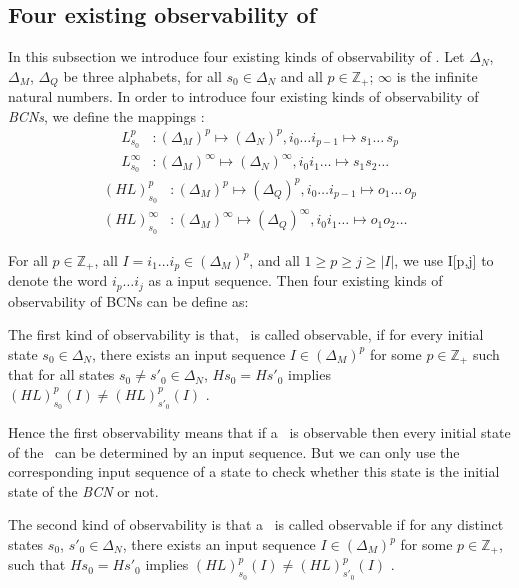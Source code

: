 \subsection{Four existing observability of \BCNs}
In this subsection we introduce four existing kinds of observability of \BCNs. Let $\Delta_N$, $\Delta_M$, $\Delta_Q$ be three alphabets, for all $s_0\in \Delta_N$ and all $p\in \mathbb{Z}_+$; $\infty$ is the infinite natural numbers. In order to introduce four existing kinds of observability of {\em BCNs}, we define the mappings \cite{Zhang2016Observability}:
\begin{equation}
\begin{split}
L^p_{s_0} &: (\Delta_M)^p\mapsto(\Delta_N)^p, i_0\ldots i_{p-1} \mapsto s_1 \ldots\, s_p\\
L^{\infty}_{s_0} &: (\Delta_M)^{\infty}\mapsto(\Delta_N)^{\infty}, i_0 i_1 \ldots  \mapsto s_1 s_2 \ldots
\end{split}
\end{equation}
\begin{equation}
\begin{split}
(HL)^p_{s_0} &: (\Delta_M)^p\mapsto(\Delta_Q)^p, i_0\ldots i_{p-1} \mapsto o_1\ldots\, o_p\\
(HL)^{\infty}_{s_0} &: (\Delta_M)^{\infty}\mapsto(\Delta_Q)^{\infty}, i_0 i_1 \ldots  \mapsto o_1 o_2\ldots
\end{split}
\end{equation}

For all  $p\in \mathbb{Z}_+$, all $I=i_1 \ldots i_p \in(\Delta_M)^p$, and all $1\ge p \ge j \ge |I|$, we use I[p,j] to denote the word $i_p \ldots i_j$ as a input sequence. Then four existing kinds of observability of BCNs can be define as: 
\begin{definition}
The first kind of observability is that, \BCN\ is called observable, if for every initial state $s_0 \in \Delta_N$, there exists an input sequence $I\in(\Delta_M)^p$ for some $p\in \mathbb{Z}_+$ such that for all states $s_0\neq {s'}_0\in \Delta_N$, $Hs_0=H{s'}_0$ implies $(HL)^p_{s_0}(I)\neq (HL)^p_{{s'}_0}(I)$ \cite{cheng2009controllability}.
\end{definition}

Hence the first observability means that if a \BCN\ is observable then every initial state of the \BCN\ can be determined by an input sequence. But we can only use the corresponding input sequence of a state to check whether this state is the initial state of the {\em BCN} or not.
\begin{definition}
	The second kind of observability is that a \BCN\ is called observable if for any distinct states $s_0$, ${s'}_0 \in \Delta_N$, there exists an input sequence $I\in(\Delta_M)^p$ for some $p\in \mathbb{Z}_+$, such that $Hs_0=H{s'}_0$ implies $(HL)^p_{s_0}(I)\neq (HL)^p_{{s'}_0}(I)$ \cite{Zhao2010Input}.
\end{definition}

